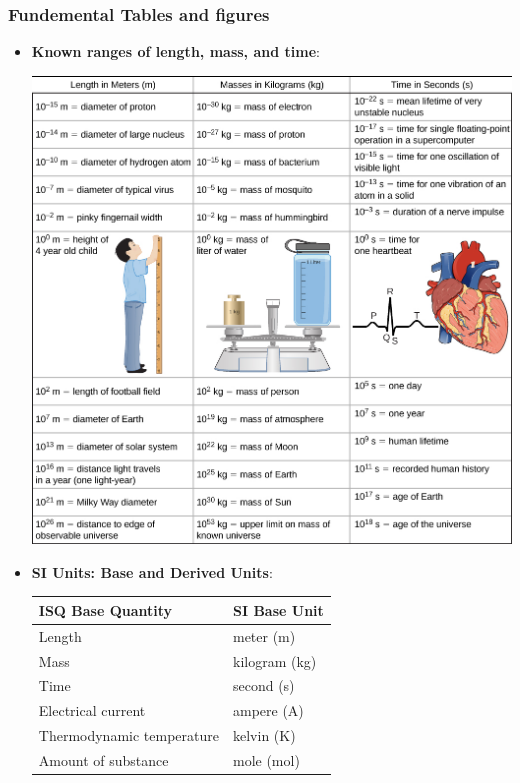 \documentclass{report}
\begin{document}
    \subsubsection{Fundemental Tables and figures}
    \begin{itemize}
        \item \textbf{Known ranges of length, mass, and time}:
            \begin{center}
                \includegraphics[scale=.7]{./figures/physfig1.jpeg  }
            \end{center}
        \item \textbf{SI Units: Base and Derived Units}:
            \bigbreak \noindent 
            \begin{tabularx}{\textwidth}{|X|X|}
                \hline
                ISQ Base Quantity & SI Base Unit \\
                \hline
                Length & meter (m) \\
                Mass & kilogram (kg) \\
                Time & second (s) \\
                Electrical current & ampere (A) \\
                Thermodynamic temperature & kelvin (K) \\
                Amount of substance & mole (mol) \\

\end{tabularx}
\end{itemize}
\end{document}
